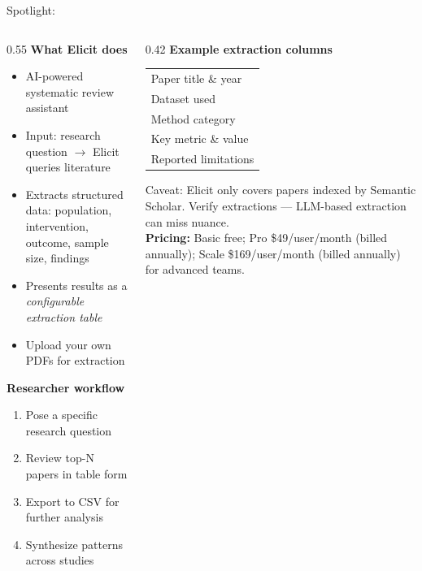 \begin{frame}{Spotlight: }
  \begin{columns}[T, onlytextwidth]
    \begin{column}{0.55\textwidth}
      \small
      \textbf{What Elicit does}\\[0.2em]
      \begin{itemize}
        \item AI-powered systematic review assistant
        \item Input: research question $\to$ Elicit queries literature
        \item Extracts structured data: population, intervention,\\ outcome, sample size, findings
        \item Presents results as a \emph{configurable extraction table}
        \item Upload your own PDFs for extraction
      \end{itemize}
      \vspace{0.2em}
      \textbf{Researcher workflow}\\[0.2em]
      \begin{enumerate}
        \item Pose a specific research question
        \item Review top-N papers in table form
        \item Export to CSV for further analysis
        \item Synthesize patterns across studies
      \end{enumerate}
    \end{column}
    \hfill
    \begin{column}{0.42\textwidth}
      \textbf{Example extraction columns}\\[0.4em]
      \begin{tabular}{l}
        \toprule
        Paper title \& year \\
        Dataset used \\
        Method category \\
        Key metric \& value \\
        Reported limitations \\
        \bottomrule
      \end{tabular}
      \vspace{0.7em}
      \alert{Caveat:} Elicit only covers papers indexed by Semantic Scholar. Verify extractions — LLM-based extraction can miss nuance.\\
      \vspace{0.3em}
      \textbf{Pricing:} Basic free; Pro \$49/user/month (billed annually); Scale \$169/user/month (billed annually) for advanced teams.
    \end{column}
  \end{columns}
\end{frame}

